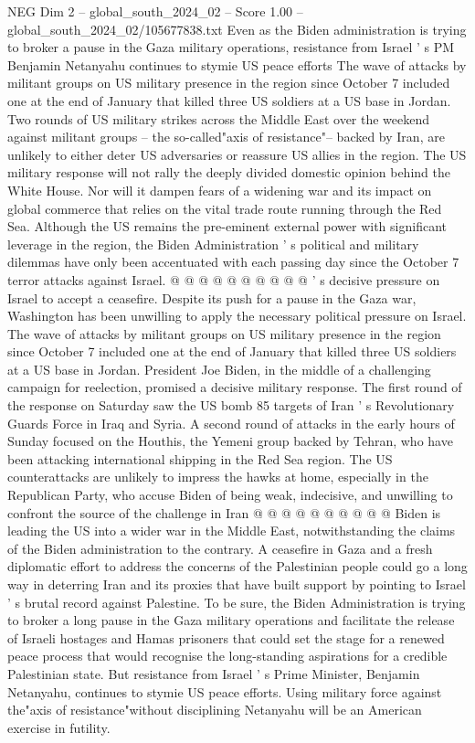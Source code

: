 \begin{textsample}{NEG Dim 2 – global\_south\_2024\_02 – Score 1.00 – global\_south\_2024\_02/105677838.txt}  \label{ex:f2_neg_415}
Even as the Biden administration is trying to broker a pause in the Gaza military operations, resistance from Israel ' s PM Benjamin Netanyahu continues to stymie US peace efforts The wave of attacks by militant groups on US military presence in the region since October 7 included one at the end of January that killed three US soldiers at a US base in Jordan.
Two rounds of US military strikes across the Middle East over the weekend against militant groups -- the so-called"axis of resistance"-- backed by Iran, are unlikely to either deter US adversaries or reassure US allies in the region.
The US military response will not rally the deeply divided domestic opinion behind the White House.
Nor will it dampen fears of a widening war and its impact on global commerce that relies on the vital trade route running through the Red Sea.
Although the US remains the pre-eminent external power with significant leverage in the region, the Biden Administration ' s political and military dilemmas have only been accentuated with each passing day since the October 7 terror attacks against Israel. @ @ @ @ @ @ @ @ @ @ ' s decisive pressure on Israel to accept a ceasefire.
Despite its push for a pause in the Gaza war, Washington has been unwilling to apply the necessary political pressure on Israel.
The wave of attacks by militant groups on US military presence in the region since October 7 included one at the end of January that killed three US soldiers at a US base in Jordan.
President Joe Biden, in the middle of a challenging campaign for reelection, promised a decisive military response.
The first round of the response on Saturday saw the US bomb 85 targets of Iran ' s Revolutionary Guards Force in Iraq and Syria.
A second round of attacks in the early hours of Sunday focused on the Houthis, the Yemeni group backed by Tehran, who have been attacking international shipping in the Red Sea region.
The US counterattacks are unlikely to impress the hawks at home, especially in the Republican Party, who accuse Biden of being weak, indecisive, and unwilling to confront the source of the challenge in Iran @ @ @ @ @ @ @ @ @ @ Biden is leading the US into a wider war in the Middle East, notwithstanding the claims of the Biden administration to the contrary.
A ceasefire in Gaza and a fresh diplomatic effort to address the concerns of the Palestinian people could go a long way in deterring Iran and its proxies that have built support by pointing to Israel ' s brutal record against Palestine.
To be sure, the Biden Administration is trying to broker a long pause in the Gaza military operations and facilitate the release of Israeli hostages and Hamas prisoners that could set the stage for a renewed peace process that would recognise the long-standing aspirations for a credible Palestinian state.
But resistance from Israel ' s Prime Minister, Benjamin Netanyahu, continues to stymie US peace efforts.
Using military force against the"axis of resistance"without disciplining Netanyahu will be an American exercise in futility.

\end{textsample}
